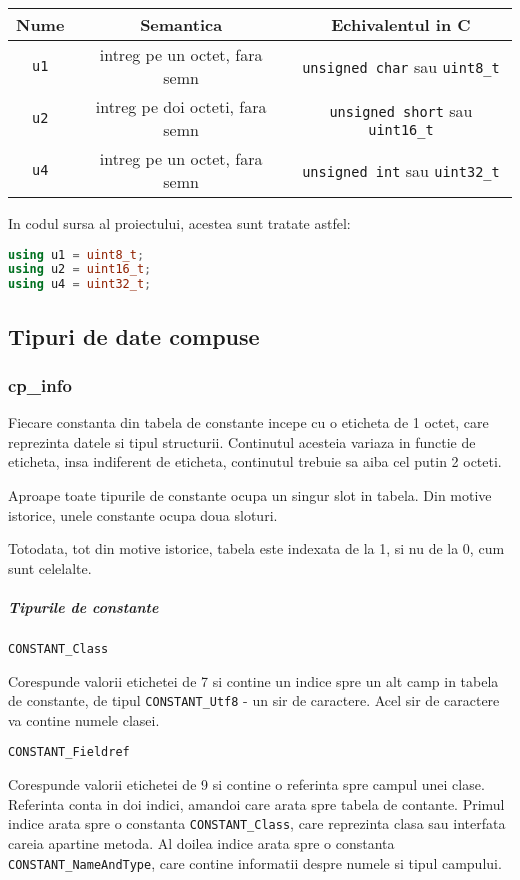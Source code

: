 \begin{longtable}[]{@{}ccc@{}}
\toprule
Nume & Semantica & Echivalentul in C\tabularnewline
\midrule
\endhead
\texttt{u1} & intreg pe un octet, fara semn & \texttt{unsigned\ char}
sau \texttt{uint8\_t}\tabularnewline
\texttt{u2} & intreg pe doi octeti, fara semn & \texttt{unsigned\ short}
sau \texttt{uint16\_t}\tabularnewline
\texttt{u4} & intreg pe un octet, fara semn & \texttt{unsigned\ int} sau
\texttt{uint32\_t}\tabularnewline
\bottomrule
\end{longtable}

In codul sursa al proiectului, acestea sunt tratate astfel:

\begin{lstlisting}[language=C++]
using u1 = uint8_t;
using u2 = uint16_t;
using u4 = uint32_t;
\end{lstlisting}

\subsection{Tipuri de date compuse}

\subsubsection{cp\_info}

Fiecare constanta din tabela de constante incepe cu o eticheta de 1
octet, care reprezinta datele si tipul structurii. Continutul acesteia
variaza in functie de eticheta, insa indiferent de eticheta, continutul
trebuie sa aiba cel putin 2 octeti.

Aproape toate tipurile de constante ocupa un singur slot in tabela.
Din motive istorice, unele constante ocupa doua sloturi.

Totodata, tot din motive istorice, tabela este indexata de la 1, si nu
de la 0, cum sunt celelalte.

\subparagraph{Tipurile de constante}\label{tipurile-de-constante}

\texttt{CONSTANT\_Class}

Corespunde valorii etichetei de 7 si contine un indice spre un alt camp
in tabela de constante, de tipul \texttt{CONSTANT\_Utf8} - un sir de
caractere. Acel sir de caractere va contine numele clasei.

\texttt{CONSTANT\_Fieldref}

Corespunde valorii etichetei de 9 si contine o referinta spre campul
unei clase. Referinta conta in doi indici, amandoi care arata spre
tabela de contante. Primul indice arata spre o constanta
\texttt{CONSTANT\_Class}, care reprezinta clasa sau interfata careia
apartine metoda. Al doilea indice arata spre o constanta
\texttt{CONSTANT\_NameAndType}, care contine informatii despre numele si
tipul campului.


